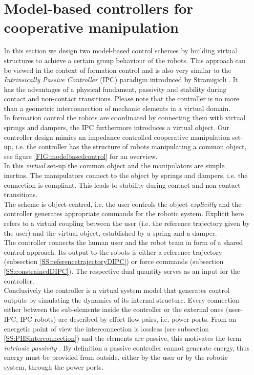 \documentclass[a4paper,twoside, openright,12pt]{report}
\begin{document}
\section{Model-based controllers for cooperative manipulation}\label{S:modelbasedcontrol}
In this section we design two model-based control schemes by building virtual structures to achieve a certain group behaviour of the robots. This approach can be viewed in the context of formation control and is also very similar to the \emph{Intrinsically Passive Controller} (IPC) paradigm introduced by Stramigioli \cite{Stramigioli_01}. It has the advantages of a physical fundament, passivity and stability during contact and non-contact transitions. Please note that the controller is no more than a geometric interconnection of mechanic elements in a virtual domain.\\
In formation control the robots are coordinated by connecting them with virtual springs and dampers, the IPC furthermore introduces a virtual object.
Our controller design mimics an impedance controlled cooperative manipulation set-up, i.e. the controller has the structure of robots manipulating a common object, see figure \ref{FIG:modelbasedcontrol} for an overview.\\
In this \emph{virtual} set-up the common object and the manipulators are simple inertias. The manipulators connect to the object by springs and dampers, i.e. the connection is compliant. This leads to stability during contact and non-contact transitions.\\
The scheme is object-centred, i.e. the user controls the object \emph{explicitly} and the controller generates appropriate commands for the robotic system. Explicit here refers to a virtual coupling between the user (i.e. the reference trajectory given by the user) and the virtual object, established by a spring and a damper.\\
The controller connects the human user and the robot team in form of a shared control approach. Its output to the robots is either a reference trajectory (subsection \ref{SS:referencetrajectoryDIPC}) or force commands (subsection \ref{SS:constrainedDIPC}). The respective dual quantity serves as an input for the controller.\\
Conclusively the controller is a virtual system model that generates control outputs by simulating the  dynamics of its internal structure. 
Every connection either between the sub-elements inside the controller or the external ones (user-IPC, IPC-robots) are described by effort-flow pairs, i.e. power ports. From an energetic point of view the interconnection is lossless (see subsection \ref{SS:PHSinterconnection}) and the elements are passive, this motivates the term \emph{intrinsic passivity} \cite{Stramigioli_01}. By definition a passive controller cannot generate energy, thus energy must be provided from outside, either by the user or by the robotic system, through the power ports.\\
\end{document}
